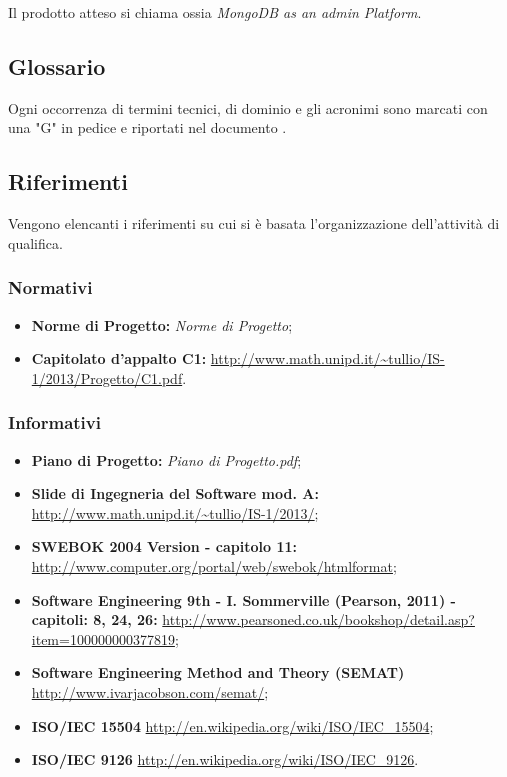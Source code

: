 Il prodotto atteso si chiama  ossia \emph{MongoDB as an admin Platform}. 

\subsection{Glossario}
Ogni occorrenza di termini tecnici, di dominio e gli acronimi sono marcati con una "G" in pedice e riportati nel documento \Glossario{}.

\subsection{Riferimenti}
Vengono elencanti i riferimenti su cui si è basata l'organizzazione dell'attività di qualifica.
	\subsubsection{Normativi}
		\begin{itemize}
  			\item \textbf{Norme di Progetto:}  \emph{Norme di Progetto};
			\item \textbf{Capitolato d'appalto C1:} \url{http://www.math.unipd.it/~tullio/IS-1/2013/Progetto/C1.pdf}.
		\end{itemize}
	\subsubsection{Informativi}
		\begin{itemize}
  			\item \textbf{Piano di Progetto:} \emph{Piano di Progetto.pdf};
  			\item \textbf{Slide di Ingegneria del Software mod. A:} \url{http://www.math.unipd.it/~tullio/IS-1/2013/};
  			\item \textbf{SWEBOK 2004 Version - capitolo 11:} \url{http://www.computer.org/portal/web/swebok/htmlformat}; 
  			\item \textbf{Software Engineering 9th - I. Sommerville (Pearson, 2011) - capitoli: 8, 24, 26:} \url{http://www.pearsoned.co.uk/bookshop/detail.asp?item=100000000377819};
  			\item \textbf{Software Engineering Method and Theory (SEMAT)} \url{http://www.ivarjacobson.com/semat/};
  			\item \textbf{ISO/IEC 15504} \url{http://en.wikipedia.org/wiki/ISO/IEC_15504};
			\item \textbf{ISO/IEC 9126} \url{http://en.wikipedia.org/wiki/ISO/IEC_9126}.
		\end{itemize}
	

